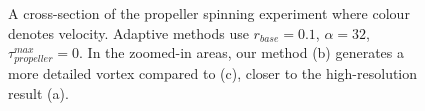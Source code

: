 \documentclass[VANCOUVER,STIX1COL]{WileyNJD-v2}
\begin{document}
\begin{figure}[htbp]

\centering
{}
\vspace{-0.7\baselineskip}
\caption{
A cross-section of the propeller spinning experiment where colour denotes velocity. Adaptive methods use $r_{base} = 0.1$, $\alpha = 32$, $\tau^{max}_{propeller} = 0$. In the zoomed-in areas, our method (b) generates a more detailed vortex compared to (c), closer to the high-resolution result (a).
}
\label{fig:prop}

\end{figure}
\end{document}
